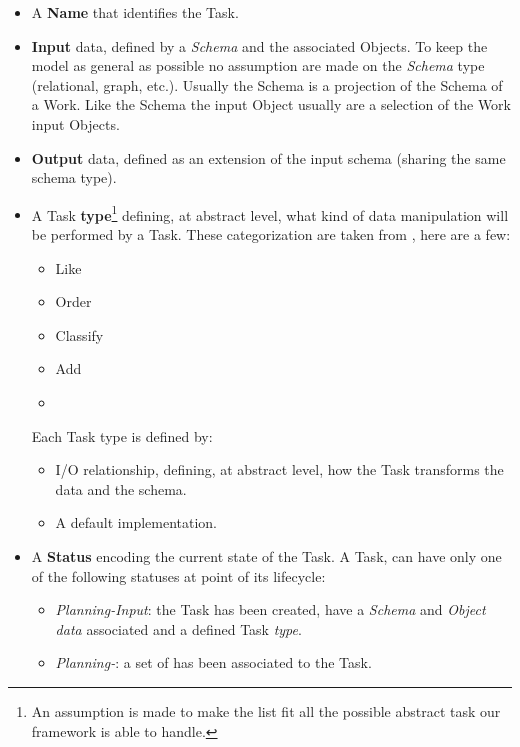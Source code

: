 \begin{itemize}
    \item A \textbf{Name} that identifies the Task.

    \item \textbf{Input} data, defined by a \emph{Schema} and the associated
    Objects. To keep the model as general as possible no assumption are made on
    the \emph{Schema} type (relational, graph, etc.). Usually the Schema
    is a projection of the Schema of a Work. Like the Schema the input Object
    usually are a selection of the Work input Objects.
    \item \textbf{Output} data, defined as an extension of the input schema
    (sharing the same schema type).

    \item A Task \textbf{type}\footnote{An assumption is made to make the list fit
    all the possible abstract task our framework is able to handle.}
    defining, at abstract level, what kind of data manipulation will be performed
    by a Task. These categorization are taken from \cite{paperboz}, here are a
    few:
        \begin{itemize}
            \item Like
            \item Order
            \item Classify
            \item Add
            \item \omissis
        \end{itemize}
    \noindent Each Task type is defined by:
        \begin{itemize}
            \item I/O relationship, defining, at abstract level, how the Task
            transforms the data and the schema.
            \item A default implementation.
        \end{itemize}

    \item A \textbf{Status} encoding the current state of the Task. A Task, can
    have only one of the following statuses at point of its lifecycle:
        \begin{itemize}
            \item \emph{Planning-Input}: the Task has been created, have a
            \emph{Schema} and \emph{Object data} associated and a defined Task
            \emph{type}.

            \item \emph{Planning-\utask{}}: a set of \utask{} has been associated
            to the Task.
            

\end{itemize}
\end{itemize}
